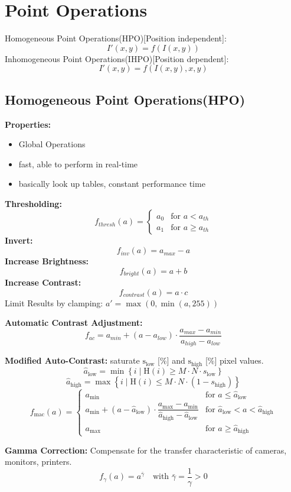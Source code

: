 \section{Point Operations}
Homogeneous Point Operations(HPO)[Position independent]:
\[
I'(x,y) = f(I(x,y))
\]
Inhomogeneous Point Operations(IHPO)[Position dependent]:
\[
I'(x,y) = f(I(x,y),x,y)
\]
\subsection{Homogeneous Point Operations(HPO)}
\textbf{Properties:}
\begin{itemize}
    \item Global Operations
    \item fast, able to perform in real-time
    \item basically look up tables, constant performance time
\end{itemize}
\textbf{Thresholding:}
\[
f_{thresh}(a) =
\begin{cases}
    a_0 & \text{for } a < a_{th} \\
    a_1 & \text{for } a \geq a_{th}
\end{cases}
\]
\textbf{Invert:}
\[
f_{inv}(a) = a_{max} - a
\]
\textbf{Increase Brightness:}
\[
f_{bright}(a) = a + b
\]
\textbf{Increase Contrast:}
\[
f_{contrast}(a) = a \cdot c
\]
Limit Results by clamping: \( a' = \max(0,\min(a,255))\)

\textbf{Automatic Contrast Adjustment:}
\[
f_{ac} = a_{min} + (a - a_{low})    \cdot 
    \frac{a_{max} - a_{min}}{a_{high} - a_{low}} 
\]

\textbf{Modified Auto-Contrast:}
saturate \(\text{s}_\text{low}\) [\%] and \(\text{s}_\text{high}\)  [\%] pixel values.
\[
\hat{a}_{\text{low}} = \min \left\{ i \mid \mathrm{H}(i) \geq M \cdot N \cdot s_{\text{low}} \right\}
\]
\[
\hat{a}_{\text{high}} = \max \left\{ i \mid \mathrm{H}(i) \leq M \cdot N \cdot (1 - s_{\text{high}}) \right\}
\]
\[
f_{\text{mac}}(a) = 
\begin{cases}
a_{\min} & \text{for } a \leq \hat{a}_{\text{low}} \\
a_{\min} + (a - \hat{a}_{\text{low}}) \cdot \dfrac{a_{\max} - a_{\min}}{\hat{a}_{\text{high}} - \hat{a}_{\text{low}}} & \text{for } \hat{a}_{\text{low}} < a < \hat{a}_{\text{high}} \\
a_{\max} & \text{for } a \geq \hat{a}_{\text{high}}
\end{cases}
\]

\textbf{Gamma Correction:}
Compensate for the transfer characteristic of cameras, monitors, printers.
\[
f_{\gamma}(a) = a^{\bar{\gamma}} \quad \text{with } \bar{\gamma} = \frac{1}{\gamma} > 0
\]

